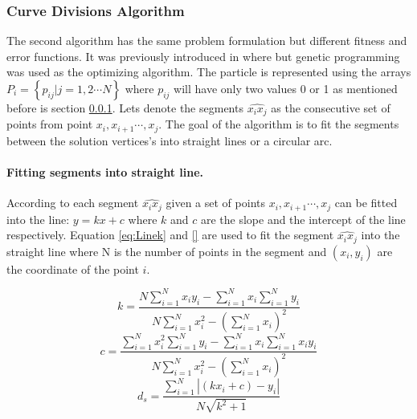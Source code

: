 \subsubsection{Curve Divisions Algorithm}
\label{sec:PolygonDivisionAlgorithm}

The second algorithm has the same problem formulation but different fitness and error functions. It was previously introduced in  \cite{CruveDivisionSwarm} where but genetic programming was used as the optimizing algorithm. The particle is represented using the arrays $P_i = \left\{ {p_{ij} \left| {j = 1,2 \cdots N} \right.} \right\}$ where $p_{ij}$ will have only two values 0 or 1 as mentioned before is section \ref{sec:PolygonDivisionAlgorithm}. Lets denote the segments $\widehat{x_ix_j}$ as the consecutive set of points from point $x_i,x_{i+1} \cdots,x_j$.  The goal of the algorithm is to fit the segments between the solution vertices's into straight lines or a circular arc. 
\paragraph{Fitting segments into straight line.}
\label{sec:FittingSegmentIntoStraightLine}
According to \cite{CruveDivisionSwarm} each segment $\widehat{x_ix_j}$ given a set of points $x_i,x_{i+1} \cdots,x_j$ can be fitted into the line: $y=kx+c$ where $k$ and $c$ are the slope and the intercept of the line respectively. Equation \ref{eq:Linek} and \ref{} are used to fit the segment $\widehat{x_ix_j}$ into the straight line where N is the number of points in the segment and $(x_i, y_i)$ are the coordinate of the point $i$. 

\begin{equation}
\label{eq:Linek}
k = \frac{{N\sum\limits_{i = 1}^N {x_i y_i }  - \sum\limits_{i = 1}^N {x_i } \sum\limits_{i = 1}^N {y_i } }}{{N\sum\limits_{i = 1}^N {x_i^2 }  - \left( {\sum\limits_{i = 1}^N {x_i } } \right)^2 }}
\end{equation}
\begin{equation}
\label{eq:LineC}
c = \frac{{\sum\limits_{i = 1}^N {x_i^2 } \sum\limits_{i = 1}^N {y_i }  - \sum\limits_{i = 1}^N {x_i } \sum\limits_{i = 1}^N {x_i y_i } }}{{N\sum\limits_{i = 1}^N {x_i^2 }  - \left( {\sum\limits_{i = 1}^N {x_i } } \right)^2 }}
\end{equation}
\begin{equation}
\label{eq:ds}
 d_s  = \frac{{\sum\limits_{i = 1}^N {\left| {(kx_i  + c) - y_i } \right|} }}{{N\sqrt {k^2  + 1} }}
\end{equation}

